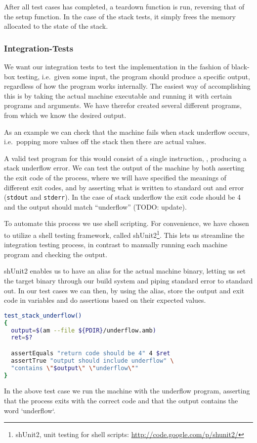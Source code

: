 After all test cases has completed, a teardown function is run, reversing that
of the setup function. In the case of the stack tests, it simply frees the
memory allocated to the state of the stack.

\subsubsection{Integration-Tests}

We want our integration tests to test the implementation in the fashion of
black-box testing, i.e.~given some input, the program should produce a specific
output, regardless of how the program works internally. The easiest way of
accomplishing this is by taking the actual machine executable and running it
with certain programs and arguments. We have therefor created several different
programs, from which we know the desired output.

As an example we can check that the machine fails when stack underflow occurs,
i.e.\ popping more values off the stack then there are actual values.

A valid test program for this would consist of a single instruction, , producing a stack underflow error. We can test the output of the machine
by both asserting the exit code of the process, where we will have specified the
meanings of different exit codes, and by asserting what is written to standard
out and error ({\tt stdout} and {\tt stderr}). In the case of stack underflow
the exit code should be 4 and the output should match ``underflow'' (TODO:
update).

To automate this process we use shell scripting. For convenience, we have chosen
to utilize a shell testing framework, called shUnit2\footnote{shUnit2, unit
  testing for shell scripts: \url{http://code.google.com/p/shunit2/}}. This lets
us streamline the integration testing process, in contrast to manually running
each machine program and checking the output.

shUnit2 enables us to have an alias for the actual machine binary, letting us
set the target binary through our build system and piping standard error to
standard out. In our test cases we can then, by using the alias, store the
output and exit code in variables and do assertions based on their expected
values.

\begin{minipage}{\linewidth}
\begin{lstlisting}[language={sh},caption={shUnit2 underflow test case}]
test_stack_underflow()
{
  output=$(am --file ${PDIR}/underflow.amb)
  ret=$?

  assertEquals "return code should be 4" 4 $ret
  assertTrue "output should include underflow" \
  "contains \"$output\" \"underflow\""
}
\end{lstlisting}
\end{minipage}

In the above test case we run the machine with the underflow program, asserting
that the process exits with the correct code and that the output contains the
word `underflow`.


